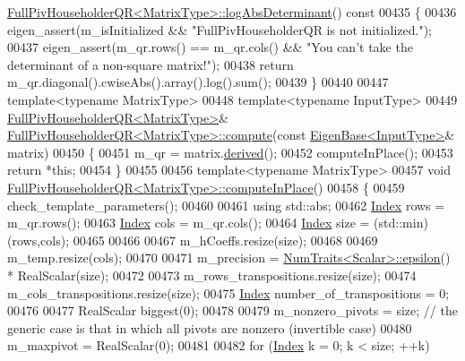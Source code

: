 \begin{DoxyCode}
      \hyperlink{group___q_r___module_aafde38918912c9b562f44b0fc3b22589}{FullPivHouseholderQR<MatrixType>::logAbsDeterminant}()\textcolor{keyword}{
       const}
00435 \textcolor{keyword}{}\{
00436   eigen\_assert(m\_isInitialized && \textcolor{stringliteral}{"FullPivHouseholderQR is not initialized."});
00437   eigen\_assert(m\_qr.rows() == m\_qr.cols() && \textcolor{stringliteral}{"You can't take the determinant of a non-square matrix!"});
00438   \textcolor{keywordflow}{return} m\_qr.diagonal().cwiseAbs().array().log().sum();
00439 \}
00440 
00447 \textcolor{keyword}{template}<\textcolor{keyword}{typename} MatrixType>
00448 \textcolor{keyword}{template}<\textcolor{keyword}{typename} InputType>
00449 \hyperlink{group___q_r___module}{FullPivHouseholderQR<MatrixType>}& 
      \hyperlink{group___q_r___module_class_eigen_1_1_full_piv_householder_q_r}{FullPivHouseholderQR<MatrixType>::compute}(\textcolor{keyword}{const} 
      \hyperlink{group___core___module_struct_eigen_1_1_eigen_base}{EigenBase<InputType>}& matrix)
00450 \{
00451   m\_qr = matrix.\hyperlink{group___core___module_a324b16961a11d2ecfd2d1b7dd7946545}{derived}();
00452   computeInPlace();
00453   \textcolor{keywordflow}{return} *\textcolor{keyword}{this};
00454 \}
00455 
00456 \textcolor{keyword}{template}<\textcolor{keyword}{typename} MatrixType>
00457 \textcolor{keywordtype}{void} \hyperlink{group___q_r___module_class_eigen_1_1_full_piv_householder_q_r}{FullPivHouseholderQR<MatrixType>::computeInPlace}()
00458 \{
00459   check\_template\_parameters();
00460 
00461   \textcolor{keyword}{using} std::abs;
00462   \hyperlink{namespace_eigen_a62e77e0933482dafde8fe197d9a2cfde}{Index} rows = m\_qr.rows();
00463   \hyperlink{namespace_eigen_a62e77e0933482dafde8fe197d9a2cfde}{Index} cols = m\_qr.cols();
00464   \hyperlink{namespace_eigen_a62e77e0933482dafde8fe197d9a2cfde}{Index} size = (std::min)(rows,cols);
00465 
00466   
00467   m\_hCoeffs.resize(size);
00468 
00469   m\_temp.resize(cols);
00470 
00471   m\_precision = \hyperlink{group___core___module_struct_eigen_1_1_num_traits}{NumTraits<Scalar>::epsilon}() * RealScalar(size);
00472 
00473   m\_rows\_transpositions.resize(size);
00474   m\_cols\_transpositions.resize(size);
00475   \hyperlink{namespace_eigen_a62e77e0933482dafde8fe197d9a2cfde}{Index} number\_of\_transpositions = 0;
00476 
00477   RealScalar biggest(0);
00478 
00479   m\_nonzero\_pivots = size; \textcolor{comment}{// the generic case is that in which all pivots are nonzero (invertible case)}
00480   m\_maxpivot = RealScalar(0);
00481 
00482   \textcolor{keywordflow}{for} (\hyperlink{namespace_eigen_a62e77e0933482dafde8fe197d9a2cfde}{Index} k = 0; k < size; ++k)

\end{DoxyCode}
